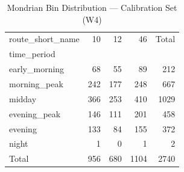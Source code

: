\begin{table}
\caption{Mondrian Bin Distribution — Calibration Set (W4)}
\label{tab:t4b_0_bin_distribution}
\begin{tabular}{lrrrr}
\toprule
route_short_name & 10 & 12 & 46 & Total \\
time_period &  &  &  &  \\
\midrule
early_morning & 68 & 55 & 89 & 212 \\
morning_peak & 242 & 177 & 248 & 667 \\
midday & 366 & 253 & 410 & 1029 \\
evening_peak & 146 & 111 & 201 & 458 \\
evening & 133 & 84 & 155 & 372 \\
night & 1 & 0 & 1 & 2 \\
Total & 956 & 680 & 1104 & 2740 \\
\bottomrule
\end{tabular}
\end{table}
